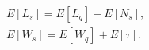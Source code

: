 \begin{equation}
    \begin{aligned}
    & E\left[L_s\right]=E\left[L_q\right]+E\left[N_s\right], \\
    & E\left[W_s\right]=E\left[W_q\right]+E[\tau] .
    \end{aligned}
\end{equation}
